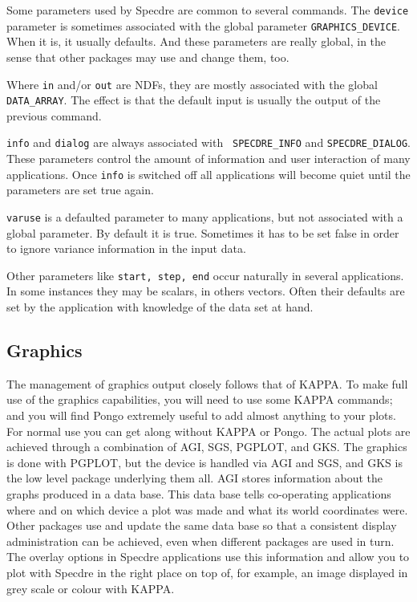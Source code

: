 \documentclass[11pt,twoside]{article}
\newcommand{\xref}[3]{#1}
\newcommand{\xlabel}[1]{}
\begin{document}
   Some parameters used by Specdre are common to several commands. The
   {\tt device} parameter is sometimes associated with the global
   parameter {\tt GRAPHICS\_DEVICE}. When it is, it usually
   defaults. And these parameters are really global, in the sense that
   other packages may use and change them, too.

   Where {\tt in} and/or {\tt out} are NDFs, they are mostly associated
   with the global {\tt DATA\_ARRAY}. The effect is that the default
   input is usually the output of the previous command.

   {\tt info} and {\tt dialog} are always associated with {\tt
   SPECDRE\_INFO} and {\tt SPECDRE\_DIALOG}. These parameters control
   the amount of information and user interaction of many applications.
   Once {\tt info} is switched off all applications will become quiet
   until the parameters are set true again.

   {\tt varuse} is a defaulted parameter to many applications, but not
   associated with a global parameter. By default it is true. Sometimes
   it has to be set false in order to ignore variance information in the
   input data.

   Other parameters like {\tt start, step, end} occur naturally in
   several applications. In some instances they may be scalars, in
   others vectors. Often their defaults are set by the application with
   knowledge of the data set at hand.


\subsection{\label{specdregraphics}\xlabel{specdregraphics}Graphics}

   The management of graphics output closely follows that of
\xref{KAPPA.}{sun95}{}
   To make full use of the graphics capabilities, you will need to use
   some KAPPA commands; and you will find
\xref{Pongo}{sun137}{}
   extremely useful to add almost anything to your plots.  For normal
   use you can get along without KAPPA or Pongo. The actual plots are
   achieved through a combination of AGI, SGS, PGPLOT, and GKS.
   The graphics is done with
\xref{PGPLOT,}{sun15}{}
   but the device is handled via
\xref{AGI}{sun48}{}
   and
\xref{SGS,}{sun85}{}
   and
\xref{GKS}{sun83}{}
   is the low level package underlying them all.  AGI stores information
   about the graphs produced in a data base.  This data base tells
   co-operating applications where and on which device a plot was made and
   what its world coordinates were.  Other packages use and update the
   same data base so that a consistent display administration can be
   achieved, even when different packages are used in turn. The overlay
   options in Specdre applications use this information and allow you to
   plot with Specdre in the right place on top of, for example, an image
   displayed in grey scale or colour with KAPPA.
\end{document}
